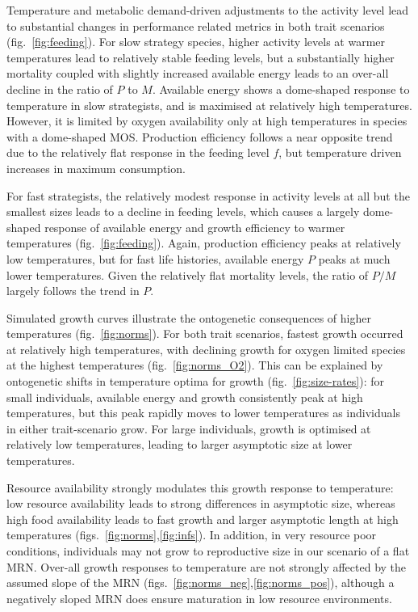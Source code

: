 \documentclass[11pt]{article}\usepackage[]{graphicx}\usepackage[]{color,soul}
\begin{document}
Temperature and metabolic demand-driven adjustments to the activity level lead to substantial changes in performance related metrics in both trait scenarios (fig.~\ref{fig:feeding}). For slow strategy species, higher activity levels at warmer temperatures lead to relatively stable feeding levels, but a substantially higher mortality coupled with slightly increased available energy leads to an over-all decline in the ratio of $P$ to $M$. Available energy shows a dome-shaped response to temperature in slow strategists, and is maximised at relatively high temperatures. However, it is limited by oxygen availability only at high temperatures in species with a dome-shaped MOS. Production efficiency follows a near opposite trend due to the relatively flat response in the feeding level $f$, but temperature driven increases in maximum consumption.

For fast strategists, the relatively modest response in activity levels at all but the smallest sizes leads to a decline in feeding levels, which causes a largely dome-shaped response of available energy and growth efficiency to warmer temperatures (fig.~\ref{fig:feeding}). Again, production efficiency peaks at relatively low temperatures, but for fast life histories, available energy $P$ peaks at much lower temperatures. Given the relatively flat mortality levels, the ratio of $P/M$ largely follows the trend in $P$. 

Simulated growth curves illustrate the ontogenetic consequences of higher temperatures (fig.~\ref{fig:norms}). For both trait scenarios, fastest growth occurred at relatively high temperatures, with declining growth for oxygen limited species at the highest temperatures (fig.~\ref{fig:norms_O2}). This can be explained by ontogenetic shifts in temperature optima for growth (fig.~\ref{fig:size-rates}): for small individuals, available energy and growth consistently peak at high temperatures, but this peak rapidly moves to lower temperatures as individuals in either trait-scenario grow. For large individuals, growth is optimised at relatively low temperatures, leading to larger asymptotic size at lower temperatures. 

Resource availability strongly modulates this growth response to temperature: low resource availability leads to strong differences in asymptotic size, whereas high food availability leads to fast growth and larger asymptotic length at high temperatures (figs.~\ref{fig:norms},\ref{fig:infs}). In addition, in very resource poor conditions, individuals may not grow to reproductive size in our scenario of a flat MRN. Over-all growth responses to temperature are not strongly affected by the assumed slope of the MRN (figs.~\ref{fig:norms_neg},\ref{fig:norms_pos}), although a negatively sloped MRN does ensure maturation in low resource environments.
\end{document}
